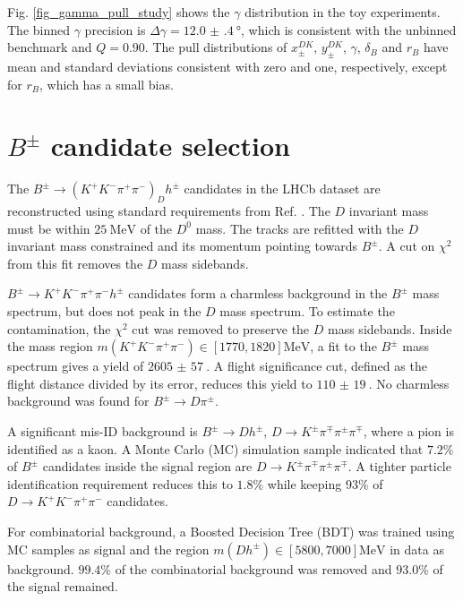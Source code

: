 \documentclass[12pt, a4paper, notitlepage, onecolumn]{article}
\begin{document}
Fig. \ref{fig_gamma_pull_study} shows the $\gamma$ distribution in the toy experiments. The binned $\gamma$ precision is $\Delta\gamma = \SI{12.0(4)}{\degree}$, which is consistent with the unbinned benchmark and $Q = 0.90$. The pull distributions of $x_\pm^{DK}$, $y_\pm^{DK}$, $\gamma$, $\delta_B$ and $r_B$ have mean and standard deviations consistent with zero and one, respectively, except for $r_B$, which has a small bias.

\section{\texorpdfstring{$B^\pm$}{B} candidate selection}
\noindent The $B^\pm\to (K^+K^-\pi^+\pi^-)_Dh^\pm$ candidates in the LHCb dataset are reconstructed using standard requirements from Ref. \cite{cite_LHCbGGSZKSpipi}. The $D$ invariant mass must be within $\SI{25}{\mega\eV}$ of the $D^0$ mass. The tracks are refitted with the $D$ invariant mass constrained and its momentum pointing towards $B^\pm$. A cut on $\chi^2$ from this fit removes the $D$ mass sidebands.

$B^\pm\to K^+K^-\pi^+\pi^-h^\pm$ candidates form a charmless background in the $B^\pm$ mass spectrum, but does not peak in the $D$ mass spectrum. To estimate the contamination, the $\chi^2$ cut was removed to preserve the $D$ mass sidebands. Inside the mass region $m(K^+K^-\pi^+\pi^-)\in[1770, 1820]\si{\mega\eV}$, a fit to the $B^\pm$ mass spectrum gives a yield of $\SI{2605(57)}{}$. A flight significance cut, defined as the flight distance divided by its error, reduces this yield to $\SI{110(19)}{}$. No charmless background was found for $B^\pm\to D\pi^\pm$.

A significant mis-ID background is $B^\pm\to Dh^\pm$, $D\to K^\pm\pi^\mp\pi^\pm\pi^\mp$, where a pion is identified as a kaon. A Monte Carlo (MC) simulation sample indicated that $7.2\%$ of $B^\pm$ candidates inside the signal region are $D\to K^\pm\pi^\mp\pi^\pm\pi^\mp$. A tighter particle identification requirement reduces this to $1.8\%$ while keeping $93\%$ of $D\to K^+K^-\pi^+\pi^-$ candidates.

For combinatorial background, a Boosted Decision Tree (BDT) was trained using MC samples as signal and the region $m(Dh^\pm)\in[5800, 7000]\si{\mega\eV}$ in data as background. $99.4\%$ of the combinatorial background was removed and $93.0\%$ of the signal remained.

\end{document}
